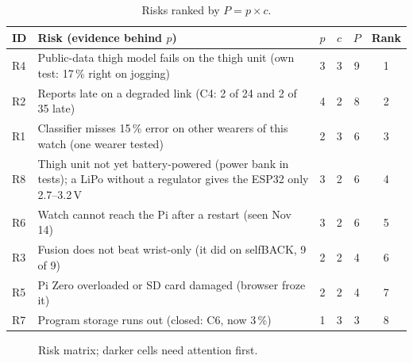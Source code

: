 \documentclass[conference]{IEEEtran}
\begin{document}
\begin{table}[!t]
\centering
\footnotesize
\setlength{\tabcolsep}{3pt}
\caption{Risks ranked by $P=p\times c$.}
\label{tab:risks}
\begin{tabular}{p{0.45cm}p{4.6cm}cccc}
\toprule
\textbf{ID} & \textbf{Risk (evidence behind $p$)} & $p$ & $c$ & $P$ & \textbf{Rank} \\
\midrule
R4 & Public-data thigh model fails on the thigh unit (own test: 17\,\% right on jogging) & 3 & 3 & 9 & 1 \\
R2 & Reports late on a degraded link (C4: 2 of 24 and 2 of 35 late) & 4 & 2 & 8 & 2 \\
R1 & Classifier misses 15\,\% error on other wearers of this watch (one wearer tested) & 2 & 3 & 6 & 3 \\
R8 & Thigh unit not yet battery-powered (power bank in tests); a LiPo without a regulator gives the ESP32 only 2.7--3.2\,V & 3 & 2 & 6 & 4 \\
R6 & Watch cannot reach the Pi after a restart (seen Nov 14) & 3 & 2 & 6 & 5 \\
R3 & Fusion does not beat wrist-only (it did on selfBACK, 9 of 9) & 2 & 2 & 4 & 6 \\
R5 & Pi Zero overloaded or SD card damaged (browser froze it) & 2 & 2 & 4 & 7 \\
R7 & Program storage runs out (closed: C6, now 3\,\%) & 1 & 3 & 3 & 8 \\
\bottomrule
\end{tabular}
\end{table}

\begin{figure}[!t]
\centering
{}
\caption{Risk matrix; darker cells need attention first.}
\label{fig:matrix}
\end{figure}
\end{document}
